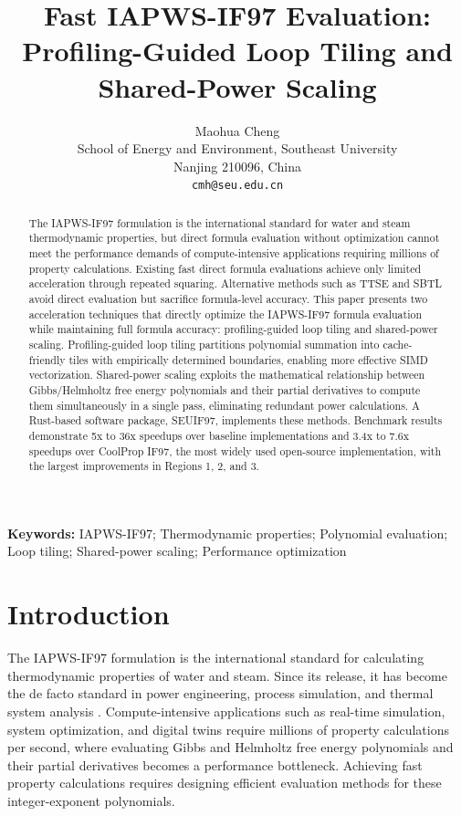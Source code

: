 \documentclass{article}
\title{Fast IAPWS-IF97 Evaluation: Profiling-Guided Loop Tiling and Shared-Power Scaling}
\author{Maohua Cheng \\
  School of Energy and Environment, Southeast University \\
  Nanjing 210096, China \\
  \texttt{cmh@seu.edu.cn}}
\date{}
\newenvironment{keywords}{\noindent\textbf{Keywords: }}{}
\begin{document}
\maketitle

\begin{abstract}
The IAPWS-IF97 formulation is the international standard for water and steam thermodynamic properties,
but direct formula evaluation without optimization cannot meet the performance demands of compute-intensive applications 
requiring millions of property calculations. Existing fast direct formula evaluations achieve only limited acceleration 
through repeated squaring. Alternative methods such as TTSE and SBTL avoid direct evaluation but sacrifice formula-level accuracy. 
This paper presents two acceleration techniques that directly optimize the IAPWS-IF97 formula evaluation while 
maintaining full formula accuracy: profiling-guided loop tiling and shared-power scaling. 
Profiling-guided loop tiling partitions polynomial summation into cache-friendly tiles with empirically determined boundaries, enabling more effective SIMD vectorization.
 Shared-power scaling exploits the mathematical relationship between Gibbs/Helmholtz free energy polynomials and their partial derivatives to compute them simultaneously in a single pass, 
 eliminating redundant power calculations. A Rust-based software package, SEUIF97, implements these methods. 
 Benchmark results demonstrate 5x to 36x speedups over baseline implementations and 3.4x to 7.6x speedups over CoolProp IF97, the most widely used open-source implementation, with the largest improvements in Regions 1, 2, and 3.
\end{abstract}

\begin{keywords}
IAPWS-IF97; Thermodynamic properties; Polynomial evaluation; Loop tiling; Shared-power scaling; Performance optimization
\end{keywords}

\section{Introduction}

The IAPWS-IF97 formulation \cite{IAPWS-IF97} is the international standard for calculating thermodynamic properties of water and steam.
Since its release, it has become the de facto standard in power engineering, process simulation, and thermal system analysis \cite{Wagner2008}. Compute-intensive applications such as real-time simulation, system optimization, and digital twins require millions of property calculations per second, where evaluating Gibbs and Helmholtz free energy polynomials and their partial derivatives becomes a performance bottleneck. Achieving fast property calculations requires designing efficient evaluation methods for these integer-exponent polynomials.
\end{document}
